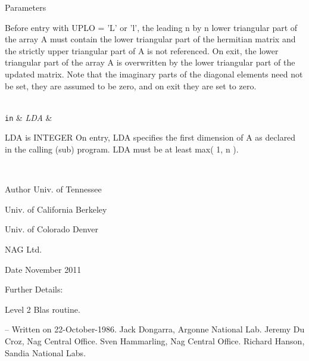 \begin{DoxyParams}[1]{Parameters}
\begin{DoxyVerb}
           Before entry with UPLO = 'L' or 'l', the leading n by n
           lower triangular part of the array A must contain the lower
           triangular part of the hermitian matrix and the strictly
           upper triangular part of A is not referenced. On exit, the
           lower triangular part of the array A is overwritten by the
           lower triangular part of the updated matrix.
           Note that the imaginary parts of the diagonal elements need
           not be set, they are assumed to be zero, and on exit they
           are set to zero.\end{DoxyVerb}
\\
\hline
\mbox{\tt in}  & {\em L\+D\+A} & \begin{DoxyVerb}          LDA is INTEGER
           On entry, LDA specifies the first dimension of A as declared
           in the calling (sub) program. LDA must be at least
           max( 1, n ).\end{DoxyVerb}
 \\
\hline
\end{DoxyParams}
\begin{DoxyAuthor}{Author}
Univ. of Tennessee 

Univ. of California Berkeley 

Univ. of Colorado Denver 

N\+A\+G Ltd. 
\end{DoxyAuthor}
\begin{DoxyDate}{Date}
November 2011 
\end{DoxyDate}
\begin{DoxyParagraph}{Further Details\+: }
\begin{DoxyVerb}  Level 2 Blas routine.

  -- Written on 22-October-1986.
     Jack Dongarra, Argonne National Lab.
     Jeremy Du Croz, Nag Central Office.
     Sven Hammarling, Nag Central Office.
     Richard Hanson, Sandia National Labs.\end{DoxyVerb}
 
\end{DoxyParagraph}
\hypertarget{group__complex16__blas__level2_gac1d92c5939cc624b2fd9e832121a0fd4}{}
